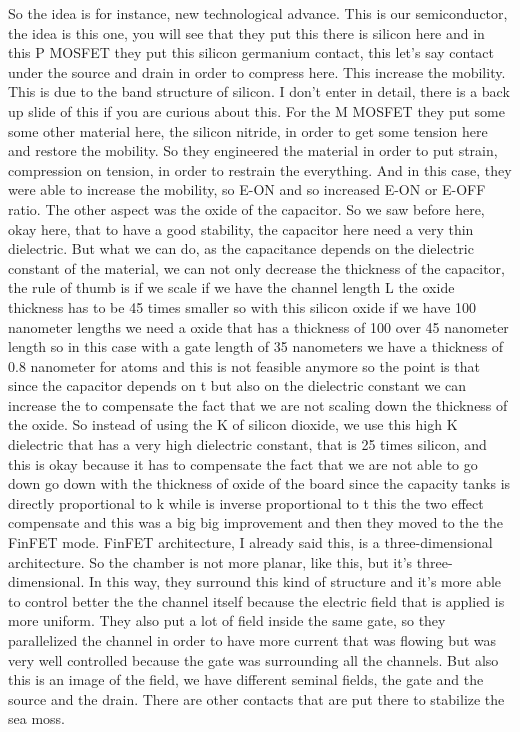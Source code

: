 So the idea is for instance, new technological advance. This is our semiconductor, the idea is this one, you will see that they put this there is silicon here and in this P MOSFET they put this silicon germanium contact, this let's say contact under the source and drain in order to compress here. This increase the mobility. This is due to the band structure of silicon. I don't enter in detail, there is a back up slide of this if you are curious about this. For the M MOSFET they put some some other material here, the silicon nitride, in order to get some tension here and restore the mobility. So they engineered the material in order to put strain, compression on tension, in order to restrain the everything. And in this case, they were able to increase the mobility, so E-ON and so increased E-ON or E-OFF ratio.
The other aspect was the oxide of the capacitor. So we saw before here, okay here, that to have a good stability, the capacitor here need a very thin dielectric. But what we can do, as the capacitance depends on the dielectric constant of the material, we can not only decrease the thickness of the capacitor, the rule of thumb is if we scale if we have the channel length L the oxide thickness has to be 45 times smaller so with this silicon oxide if we have 100 nanometer lengths we need a oxide that has a thickness of 100 over 45 nanometer length so in this case with a gate length of 35 nanometers we have a thickness of 0.8 nanometer for atoms and this is not feasible anymore so the point is that since the capacitor depends on t but also on the dielectric constant we can increase the to compensate the fact that we are not scaling down the thickness of the oxide. So instead of using the K of silicon dioxide, we use this high K dielectric that has a very high dielectric constant, that is 25 times silicon, and this is okay because it has to compensate the fact that we are not able to go down go down with the thickness of oxide of the board since the capacity tanks is directly proportional to k while is inverse proportional to t this the two effect compensate and this was a big big improvement and then they moved to the the FinFET mode.
FinFET architecture, I already said this, is a three-dimensional architecture. So the chamber is not more planar, like this, but it's three-dimensional. In this way, they surround this kind of structure and it's more able to control better the the channel itself because the electric field that is applied is more uniform. They also put a lot of field inside the same gate, so they parallelized the channel in order to have more current that was flowing but was very well controlled because the gate was surrounding all the channels. But also this is an image of the field, we have different seminal fields, the gate and the source and the drain. There are other contacts that are put there to stabilize the sea moss.
